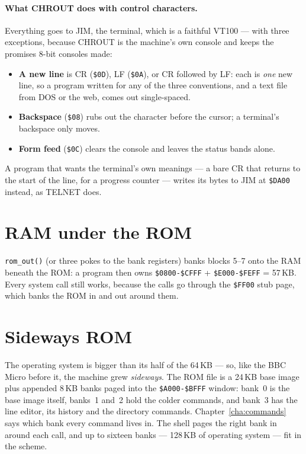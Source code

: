 \paragraph{What CHROUT does with control characters.} Everything goes to
JIM, the terminal, which is a faithful VT100 --- with three exceptions,
because CHROUT is the machine's own console and keeps the promises 8-bit
consoles made:
\begin{itemize}[leftmargin=1.4em]
\item \textbf{A new line} is CR (\texttt{\$0D}), LF (\texttt{\$0A}), or
  CR followed by LF: each is \emph{one} new line, so a program written
  for any of the three conventions, and a text file from DOS or the web,
  comes out single-spaced.
\item \textbf{Backspace} (\texttt{\$08}) rubs out the character before
  the cursor; a terminal's backspace only moves.
\item \textbf{Form feed} (\texttt{\$0C}) clears the console and leaves
  the status bands alone.
\end{itemize}
A program that wants the terminal's own meanings --- a bare CR that
returns to the start of the line, for a progress counter --- writes its
bytes to JIM at \texttt{\$DA00} instead, as TELNET does.

\section{RAM under the ROM}
\verb|rom_out()| (or three pokes to the bank registers) banks blocks 5--7
onto the RAM beneath the ROM: a program then owns
\texttt{\$0800-\$CFFF} + \texttt{\$E000-\$FEFF} = 57\,KB. Every system call
still works, because the calls go through the \texttt{\$FF00} stub page,
which banks the ROM in and out around them.

\section{Sideways ROM}
The operating system is bigger than its half of the 64\,KB --- so, like
the BBC Micro before it, the machine grew \emph{sideways}. The ROM file
is a 24\,KB base image plus appended 8\,KB banks paged into the
\texttt{\$A000-\$BFFF} window: bank~0 is the base image itself, banks~1
and~2 hold the colder commands, and bank~3 has the line editor, its
history and the directory commands. Chapter~\ref{cha:commands} says which
bank every command lives in. The shell pages the right bank in around
each call, and up to sixteen banks --- 128\,KB of operating system ---
fit in the scheme.

